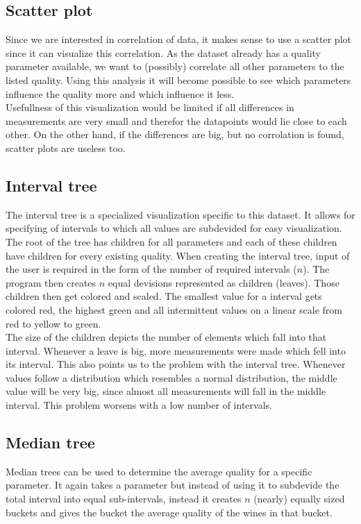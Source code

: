 \documentclass[a4paper,twoside,11pt]{article}
\begin{document}
\subsection{Scatter plot}
Since we are interested in correlation of data, it makes sense to use a scatter plot since it can visualize this correlation. As the dataset already has a quality parameter available, we want to (possibly) correlate all other parameters to the listed quality. Using this analysis it will become possible to see which parameters influence the quality more and which influence it less. \\

Usefullness of this visualization would be limited if all differences in measurements are very small and therefor the datapoints would lie close to each other. On the other hand, if the differences are big, but no corrolation is found, scatter plots are useless too.

\subsection{Interval tree}
The interval tree is a specialized visualization specific to this dataset. It allows for specifying of intervals to which all values are subdevided for easy visualization. \\

The root of the tree has children for all parameters and each of these children have children for every existing quality. When creating the interval tree, input of the user is required in the form of the number of required intervals ($n$). The program then creates $n$ equal devisions represented as children (leaves). Those children then get colored and scaled. The smallest value for a interval gets colored red, the highest green and all intermittent values on a linear scale from red to yellow to green.\\

The size of the children depicts the number of elements which fall into that interval. Whenever a leave is big, more measurements were made which fell into its interval. This also points us to the problem with the interval tree. Whenever values follow a distribution which resembles a normal distribution, the middle value will be very big, since almost all measurements will fall in the middle interval. This problem worsens with a low number of intervals.


\subsection{Median tree}
Median trees can be used to determine the average quality for a specific parameter. It again takes a parameter but instead of using it to subdevide the total interval into equal sub-intervals, instead it creates $n$ (nearly) equally sized buckets and gives the bucket the average quality of the wines in that bucket.
\end{document}
